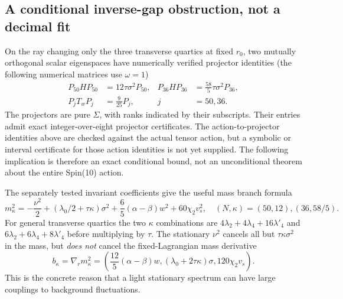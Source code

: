 \documentclass[11pt]{article}
\begin{document}
\subsection{A conditional inverse-gap obstruction, not a decimal fit}
On the ray changing only the three transverse quartics at fixed $r_0$,
two mutually orthogonal scalar eigenspaces have numerically verified
projector identities (the following numerical matrices use $\omega=1$)
\begin{align}
 P_{50}H P_{50}&=12\tau\sigma^2P_{50},&
 P_{36}H P_{36}&=\frac{58}{5}\tau\sigma^2P_{36},\\
 P_j T_w P_j&=\frac9{25}P_j,& j&=50,36.
\end{align}
The projectors are pure $\Sigma$, with ranks indicated by their
subscripts. Their entries admit exact integer-over-eight projector
certificates. The action-to-projector identities above are checked
against the actual tensor action, but a symbolic or interval
certificate for those action identities is not yet supplied. The
following implication is therefore an exact conditional bound, not
an unconditional theorem about the entire Spin(10) action.

The separately tested invariant coefficients give the useful mass
branch formula
\begin{equation}
 m_\kappa^2=-\frac{\nu^2}{2}
 +(\lambda_0/2+\tau\kappa)\sigma^2
 +\frac65(\alpha-\beta)w^2+60\chi_2v_s^2,
 \quad (N,\kappa)=(50,12),(36,58/5).
\end{equation}
For general transverse quartics the two $\kappa$ combinations are
$4\lambda_2+4\lambda_4+16\lambda'_4$ and
$6\lambda_2+6\lambda_4+8\lambda'_4$ before multiplying by $\tau$.
The stationary $\nu^2$ cancels all but $\tau\kappa\sigma^2$ in the
mass, but \emph{does not} cancel the fixed-Lagrangian mass derivative
\begin{equation}
 b_\kappa=\nabla_r m_\kappa^2
 =\left(\frac{12}{5}(\alpha-\beta)w,
 (\lambda_0+2\tau\kappa)\sigma,120\chi_2v_s\right).
\end{equation}
This is the concrete reason that a light stationary spectrum can have
large couplings to background fluctuations.
\end{document}
